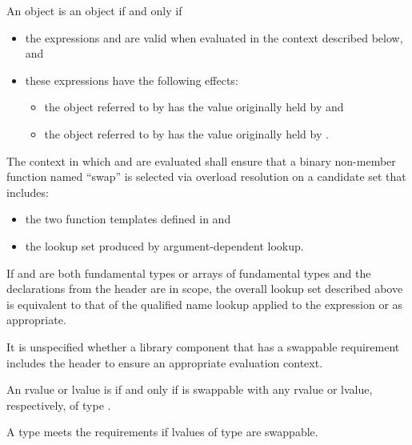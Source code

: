 \pnum
An object  is  an object  if and only if
\begin{itemize}
\item the expressions  and  are valid when
evaluated in the context described below, and

\item these expressions have the following effects:

\begin{itemize}
\item the object referred to by  has the value originally held by  and
\item the object referred to by  has the value originally held by .
\end{itemize}
\end{itemize}

\pnum
The context in which  and  are evaluated shall
ensure that a binary non-member function named ``swap'' is selected via overload
resolution on a candidate set that includes:
\begin{itemize}
\item the two  function templates defined in
 and

\item the lookup set produced by argument-dependent lookup.
\end{itemize}
\begin{note}
If  and  are both fundamental types or arrays of
fundamental types and the declarations from the header  are in
scope, the overall lookup set described above is equivalent to that of the
qualified name lookup applied to the expression  or
 as appropriate.
\end{note}
\begin{note}
It is unspecified whether a library component that has a swappable
requirement includes the header  to ensure an appropriate
evaluation context.
\end{note}

\pnum
An rvalue or lvalue  is  if and only if  is
swappable with any rvalue or lvalue, respectively, of type .

\pnum
A type  meets the  requirements
if lvalues of type  are swappable.

